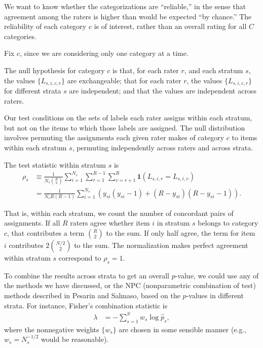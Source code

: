 \documentclass[]{article}
\begin{document}
We want to know whether the categorizations are ``reliable,'' in the sense that
agreement among the raters is higher than would be expected ``by chance.''
The reliability of each category $c$ is of interest, rather than an overall
rating for all $C$ categories.

Fix $c$, since we are considering only one category at a time.

The null hypothesis for category $c$ is that, for each rater $r$, and each
stratum $s$, the values $\{ L_{s,i,c,r} \}$ are exchangeable; that for each
rater $r$, the values $\{ L_{s,i,c,r} \}$ for different strata $s$ are
independent; and that the values are independent across raters.

Our test conditions on the sets of labels each rater assigns within each
stratum, but not on the items to which those labels are assigned.
The null distribution involves permuting the assignments each given rater makes
of category $c$ to items within each stratum $s$, permuting independently
across raters and across strata.

The test statistic within stratum $s$ is
\begin{align*}
\rho_s &\equiv \frac{1}{N_s {R \choose 2}} \sum_{i=1}^{N_s}
              \sum_{r=1}^{R-1} \sum_{v=r+1}^R \mathbf{1}(L_{s,i,r} = L_{s,i,v}) \\
              &= \frac{1}{N_s R(R-1)} \sum_{i=1}^{N_s}
                (y_{si}(y_{si}-1) + (R-y_{si})(R-y_{si}-1)).
\end{align*}

That is, within each stratum, we count the number of concordant pairs of
assignments.
If all $R$ raters agree whether item $i$ in stratum $s$ belongs to category
$c$, that contributes a term ${R \choose 2}$ to the sum.
If only half agree, the term for item $i$ contributes $2 {N/2 \choose 2}$ to
the sum.
The normalization makes perfect agreement within stratum $s$ correspond to
$\rho_s = 1$.

To combine the results across strata to get an overall $p$-value, we could
use any of the methods we have discussed, or the NPC (nonparametric
combination of test) methods described in Pesarin and Salmaso, based on
the $p$-values in different strata.
For instance, Fisher's combination statistic is
\begin{align*}
    \lambda &= - \sum_{s=1}^S w_s \log \hat{p}_s,
\end{align*}
where the nonnegative weights $\{w_s\}$ are chosen in some sensible manner
(e.g., $w_s = N_s^{-1/2}$ would be reasonable).
\end{document}
